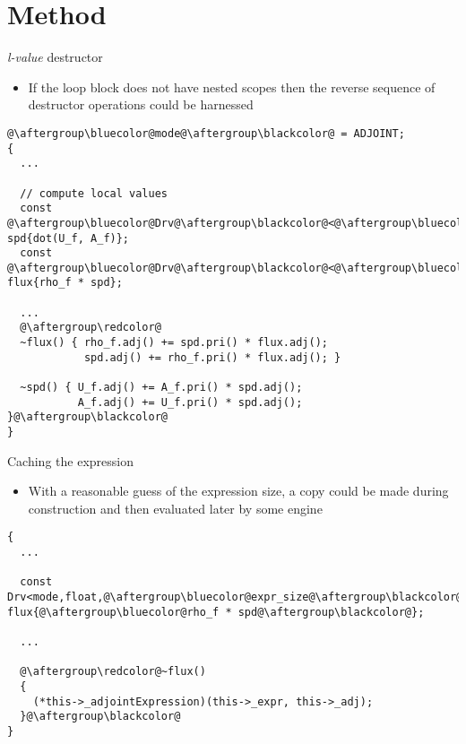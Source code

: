 \documentclass[xcolor=dvipsnames]{beamer}
\begin{document}
\section{Method}


\begin{frame}[fragile]{\emph{l-value} destructor}
\begin{itemize}
\item If the loop block does not have nested scopes then the reverse sequence of destructor operations could be harnessed \vspace{2mm}
\end{itemize}
\begin{lstlisting}
@\aftergroup\bluecolor@mode@\aftergroup\blackcolor@ = ADJOINT;
{
  ...

  // compute local values
  const @\aftergroup\bluecolor@Drv@\aftergroup\blackcolor@<@\aftergroup\bluecolor@mode@\aftergroup\blackcolor@,double> spd{dot(U_f, A_f)};
  const @\aftergroup\bluecolor@Drv@\aftergroup\blackcolor@<@\aftergroup\bluecolor@mode@\aftergroup\blackcolor@,float> flux{rho_f * spd};

  ...
  @\aftergroup\redcolor@
  ~flux() { rho_f.adj() += spd.pri() * flux.adj();
            spd.adj() += rho_f.pri() * flux.adj(); }

  ~spd() { U_f.adj() += A_f.pri() * spd.adj();
           A_f.adj() += U_f.pri() * spd.adj(); }@\aftergroup\blackcolor@
}
\end{lstlisting}
\end{frame}


\begin{frame}[fragile]{Caching the expression}
\begin{itemize}
\item With a reasonable guess of the {\color{blue}expression size}, a copy could be made during construction and then evaluated later by some {\color{red}engine} \vspace{2mm}
\end{itemize}
\begin{lstlisting}
{
  ...

  const Drv<mode,float,@\aftergroup\bluecolor@expr_size@\aftergroup\blackcolor@> flux{@\aftergroup\bluecolor@rho_f * spd@\aftergroup\blackcolor@};

  ...

  @\aftergroup\redcolor@~flux()
  {
    (*this->_adjointExpression)(this->_expr, this->_adj);
  }@\aftergroup\blackcolor@
}
\end{lstlisting}
\end{frame}
\end{document}
